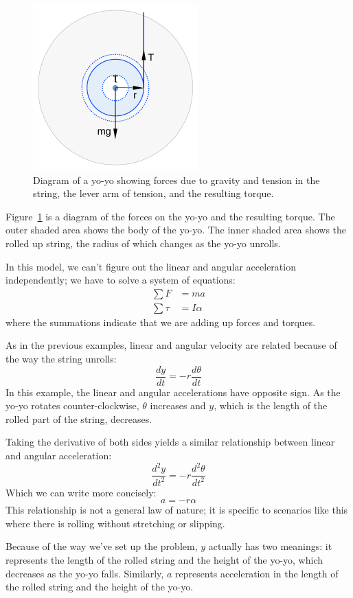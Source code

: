 \documentclass[12pt]{book}
\theoremstyle{exercise}
\begin{document}
\begin{figure}
\centerline{\includegraphics[height=2.5in]{figs/yoyo.pdf}}
\caption{Diagram of a yo-yo showing forces due to gravity and tension in the string, the lever arm of tension, and the resulting torque.}
\label{yoyo}
\end{figure}

Figure~\ref{yoyo} is a diagram of the forces on the yo-yo and the resulting torque.  The outer shaded area shows the body of the yo-yo.  The inner shaded area shows the rolled up string, the radius of which changes as the yo-yo unrolls.

In this model, we can't figure out the linear and angular acceleration independently; we have to solve a system of equations:
%
\begin{align*}
\sum F &= m a \\
\sum \tau &= I \alpha
\end{align*}
%
where the summations indicate that we are adding up forces and torques.

As in the previous examples, linear and angular velocity are related because of the way the string unrolls:
%
\[ \frac{dy}{dt} = -r \frac{d \theta}{dt} \]
%
In this example, the linear and angular accelerations have opposite sign.  As the yo-yo rotates counter-clockwise, $\theta$ increases and $y$, which is the length of the rolled part of the string, decreases.

Taking the derivative of both sides yields a similar relationship between linear and angular acceleration:
%
\[ \frac{d^2 y}{dt^2} = -r \frac{d^2 \theta}{dt^2} \]
%
Which we can write more concisely:
%
\[ a = -r \alpha \]
%
This relationship is not a general law of nature; it is specific to scenarios like this where there is rolling without stretching or slipping.

Because of the way we've set up the problem, $y$ actually has two meanings: it represents the length of the rolled string and the height of the yo-yo, which decreases as the yo-yo falls.  Similarly, $a$ represents acceleration in the length of the rolled string and the height of the yo-yo.
\end{document}

